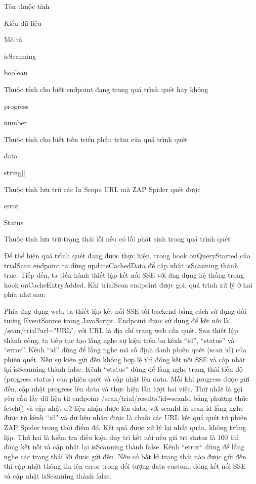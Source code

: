 Tên thuộc tính

Kiểu dữ liệu

Mô tả

isScanning

boolean

Thuộc tính cho biết endpoint đang trong quá trình quét hay không

progress

number

Thuộc tính cho biết tiến triển phần trăm của quá trình quét

data

string[]

Thuộc tính lưu trữ các In Scope URL mà ZAP Spider quét được

error

Status

Thuộc tính lưu trữ trạng thái lỗi nếu có lỗi phát sinh trong quá trình quét

Để thể hiện quá trình quét đang được thực hiện, trong hook onQueryStarted của trialScan endpoint ta dùng updateCachedData để cập nhật isScanning thành true. Tiếp đến, ta tiến hành thiết lập kết nối SSE với ứng dụng hệ thống trong hook onCacheEntryAdded. Khi trialScan endpoint được gọi, quá trình xử lý ở hai phía như sau:

Phía ứng dụng web, ta thiết lập kết nối SSE tới backend bằng cách sử dụng đối tượng EventSource trong JavaScript. Endpoint được sử dụng để kết nối là /scan/trial?url="URL", với URL là địa chỉ trang web cần quét. Sau thiết lập thành công, ta tiếp tục tạo lắng nghe sự kiện trên ba kênh “id”, “status” và “error”. Kênh “id” dùng để lắng nghe mã số định danh phiên quét (scan id) của phiên quét. Nếu sự kiện gửi đến không hợp lệ thì đóng kết nối SSE và cập nhật lại isScanning thành false. Kênh “status” dùng để lắng nghe trạng thái tiến độ (progress status) của phiên quét và cập nhật lên data. Mỗi khi progress được gửi đến, cập nhật progress lên data và thực hiện lần lượt hai việc. Thứ nhất là gọi yêu cầu lấy dữ liệu từ endpoint /scan/trial/results?id=scanId bằng phương thức fetch() và cập nhật dữ liệu nhận được lên data, với scanId là scan id lắng nghe được từ kênh “id” và dữ liệu nhận được là chuỗi các URL kết quả quét từ phiên ZAP Spider trong thời điểm đó. Kết quả được xử lý lại nhất quán, không trùng lặp. Thứ hai là kiểm tra điều kiện duy trì kết nối nếu giá trị status là 100 thì đóng kết nối và cập nhật lại isScanning thành false. Kênh “error“ dùng để lắng nghe các trạng thái lỗi được gửi đến. Nếu có bất kì trạng thái nào được gửi đến thì cập nhật thông tin lên error trong đối tượng data custom, đóng kết nối SSE và cập nhật isScanning thành false.

